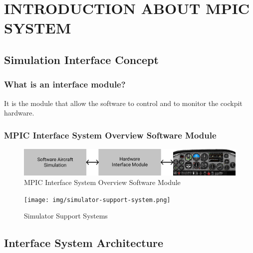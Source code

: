 \chapter{INTRODUCTION ABOUT MPIC SYSTEM}

\renewcommand{\headrulewidth}{0.5pt}
\renewcommand{\footrulewidth}{0.5pt}
\thispagestyle{plain}
\pagestyle{fancy}
\fancyhf{}
\raggedright
{}

\justifying

\section{Simulation Interface Concept}
    \subsection{What is an interface module?}
        It is the module that allow the software to control and to monitor the cockpit hardware.
    \subsection{MPIC Interface System Overview Software Module}
        \begin{figure}[H]
            \centering
            \includegraphics[width=0.6\linewidth]{img/MPIC.png}
            \caption{MPIC Interface System Overview Software Module}
        \end{figure}
        \begin{figure}[H]
            \centering
            \texttt{[image: img/simulator-support-system.png]}
            \caption{Simulator Support Systems}
        \end{figure}

\section{Interface System Architecture}
